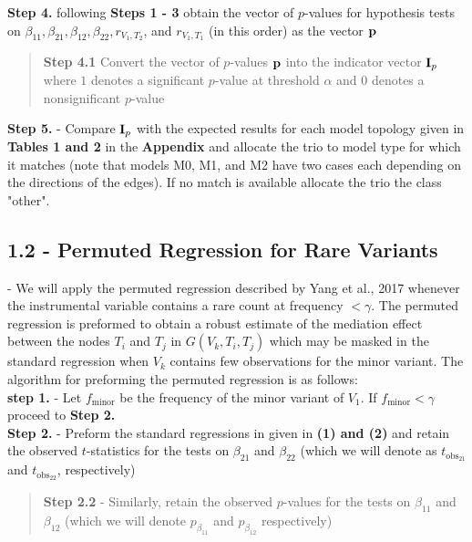 \documentclass[12pt]{report}
\begin{document}
\noindent \textbf{Step 4.} following \textbf{Steps 1 - 3} obtain the vector of $p$-values for hypothesis tests on $\beta_{11}, \beta_{21}, \beta_{12}, \beta_{22}, r_{V_1,T_2}$, and $r_{V_1, T_1}$ (in this order) as the vector $\bf {p}$\\

\begin{quote}
\textbf{Step 4.1} Convert the vector of $p$-values $\bf {p}$ into the indicator vector ${\bf I}_p$ where $1$ denotes a significant $p$-value at threshold $\alpha$ and $0$ denotes a nonsignificant $p$-value \\
\end{quote}

\noindent\textbf{Step 5.} - Compare ${\bf I}_p$ with the expected results for each model topology given in \textbf{Tables 1 and 2} in the \textbf{Appendix} and allocate the trio to model type for which it matches (note that models M0, M1, and M2 have two cases each depending on the directions of the edges). If no match is available allocate the trio the class "other". \\


\subsection*{1.2 - Permuted Regression for Rare Variants} - We will apply the permuted regression described by Yang et al., 2017 whenever the instrumental variable contains a rare count at frequency $< \gamma$. The permuted regression is preformed to obtain a robust estimate of the mediation effect between the nodes $T_i$ and $T_j$ in $G(V_k, T_i, T_j)$ which may be masked in the standard regression when $V_k$ contains few observations for the minor variant. The algorithm for preforming the permuted regression is as follows:\\


\noindent\textbf{step 1.} - Let $f_{\text{minor}}$ be the frequency of the minor variant of $V_1$. If $f_{\text{minor}} < \gamma$ proceed to \textbf{Step 2.}\\

\noindent\textbf{Step 2.} - Preform the standard regressions in given in \textbf{(1) and (2)} and retain the observed $t$-statistics for the tests on $\beta_{21}$ and $\beta_{22}$ (which we will denote as $t_{\text{obs}_{21}}$ and $t_{\text{obs}_{22}}$, respectively)

\begin{quote}
\textbf{Step 2.2} - Similarly, retain the observed $p$-values for the tests on $\beta_{11}$ and $\beta_{12}$ (which we will denote $p_{\beta_{11}}$ and $p_{\beta_{12}}$ respectively)
\end{quote}
\end{document}
